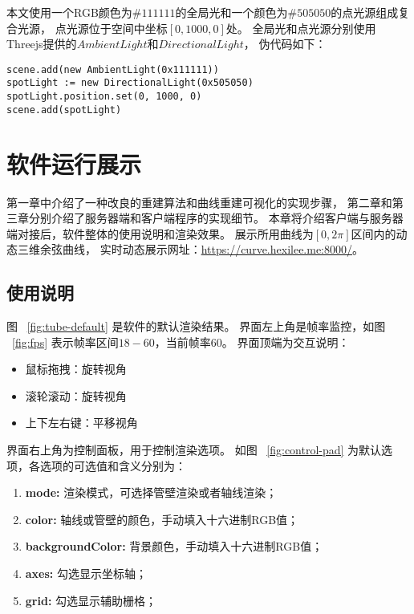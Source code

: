本文使用一个RGB颜色为$\#111111$的全局光和一个颜色为$\#505050$的点光源组成复合光源，
点光源位于空间中坐标$[0, 1000, 0]$处。
全局光和点光源分别使用Threejs提供的$AmbientLight$和$DirectionalLight$，
伪代码如下：

\begin{lstlisting}[caption={环境光}]
scene.add(new AmbientLight(0x111111))
spotLight := new DirectionalLight(0x505050)
spotLight.position.set(0, 1000, 0)
scene.add(spotLight)
\end{lstlisting}

\clearpage

\section{软件运行展示}
\label{sec:pre}
第一章中介绍了一种改良的重建算法和曲线重建可视化的实现步骤，
第二章和第三章分别介绍了服务器端和客户端程序的实现细节。
本章将介绍客户端与服务器端对接后，软件整体的使用说明和渲染效果。
展示所用曲线为$[0, 2\pi]$区间内的动态三维余弦曲线，
实时动态展示网址：\href{https://curve.hexilee.me:8000/}{https://curve.hexilee.me:8000/}。

\subsection{使用说明}
\FloatBarrier

图 ~\ref{fig:tube-default} 是软件的默认渲染结果。
界面左上角是帧率监控，如图 ~\ref{fig:fps} 表示帧率区间$18-60$，当前帧率$60$。
界面顶端为交互说明：

\begin{itemize}
\item 鼠标拖拽：旋转视角
\item 滚轮滚动：旋转视角
\item 上下左右键：平移视角
\end{itemize}

界面右上角为控制面板，用于控制渲染选项。
如图 ~\ref{fig:control-pad} 为默认选项，各选项的可选值和含义分别为：

\begin{enumerate}
\item \textbf{mode: }渲染模式，可选择管壁渲染或者轴线渲染；
\item \textbf{color: }轴线或管壁的颜色，手动填入十六进制RGB值；
\item \textbf{backgroundColor: }背景颜色，手动填入十六进制RGB值；
\item \textbf{axes: }勾选显示坐标轴；
\item \textbf{grid: }勾选显示辅助栅格；
\end{enumerate}

